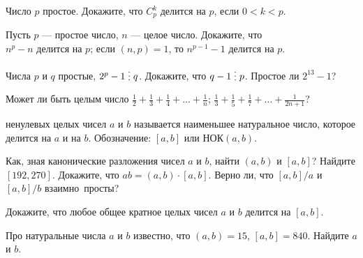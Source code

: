 \documentclass[a4paper,11pt]{article}
\newcommand{\del}{\mathrel{\raisebox{-.3 ex}{${\vdots}$}}}
\begin{document}
Число $p$ простое. Докажите, что $C_p^k$ делится на
$p$, если $0<k<p$.


Пусть $p$ --- простое число, $n$ --- целое число.
Докажите, что\\
  $n^p-n$ делится на $p$;
  если $(n,p)=1$, то $n^{p-1}-1$ делится на $p$.




Числа $p$ и $q$ простые, $2^{p}-1\del q$. Докажите,
что $q-1\del p$.
Простое ли $2^{13}-1$?


 Может ли быть целым число
$\displaystyle{\frac{1}{2}+\frac{1}{3}+\frac{1}{4}+\ldots+\frac{1}{n}}$;
$\displaystyle{\frac{1}{3}+\frac{1}{5}+\frac{1}{7}+\ldots+\frac{1}{2n+1}}$?


\vspace*{-1mm}

\vspace*{-2mm}
  ненулевых целых чисел $a$ и $b$
называется наименьшее натуральное число, которое делится на $a$ и на $b$.
Обозначение: $[a,b]$ или НОК$(a,b)$.


Как, зная канонические разложения %
чисел $a$ и $b$, найти
$(a,b)$ и $[a,b]$?
Найдите $[192,270]$.
Докажите, что $ab=(a,b) \cdot [a,b]$.
Верно ли, что $[a,b]/a$ и $[a,b]/b$ взаимно~просты?


 Докажите, что любое общее кратное
целых чисел $a$ и $b$ делится на $[a,b]$.


Про натуральные числа $a$ и $b$
известно, что $(a,b)=15$, $[a,b]=840$. Найдите $a$ и $b$.
\end{document}
